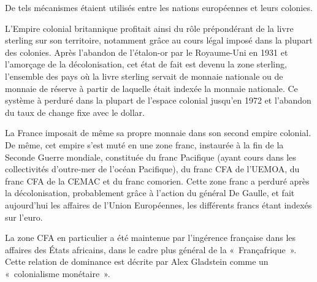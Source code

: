 
De tels mécanismes étaient utilisés entre les nations européennes et leurs colonies.

L'Empire colonial britannique profitait ainsi du rôle prépondérant de la livre sterling sur son territoire, notamment grâce au cours légal imposé dans la plupart des colonies. Après l'abandon de l'étalon-or par le Royaume-Uni en 1931 et l'amorçage de la décolonisation, cet état de fait est devenu la zone sterling, l'ensemble des pays où la livre sterling servait de monnaie nationale ou de monnaie de réserve à partir de laquelle était indexée la monnaie nationale. Ce système à perduré dans la plupart de l'espace colonial jusqu'en 1972 et l'abandon du taux de change fixe avec le dollar.

La France imposait de même sa propre monnaie dans son second empire colonial. De même, cet empire s'est muté en une zone franc, instaurée à la fin de la Seconde Guerre mondiale, constituée du franc Pacifique (ayant cours dans les collectivités d'outre-mer de l'océan Pacifique), du franc CFA de l'UEMOA, du franc CFA de la CEMAC et du franc comorien. Cette zone franc a perduré après la décolonisation, probablement grâce à l'action du général De Gaulle, et fait aujourd'hui les affaires de l'Union Européennes, les différents francs étant indexés sur l'euro.

La zone CFA en particulier a été maintenue par l'ingérence française dans les affaires des États africains, dans le cadre plus général de la «~Françafrique~». Cette relation de dominance est décrite par Alex Gladstein comme un «~colonialisme monétaire~». %

